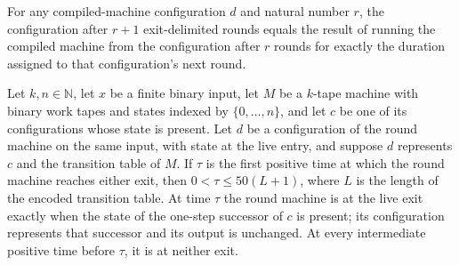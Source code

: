\begin{lemma}
\label{Turing.StepBlock.loopOrbit_succ}
\leanok
{}
For any compiled-machine configuration $d$ and natural number $r$, the configuration
after $r+1$ exit-delimited rounds equals the result of running the compiled machine from
the configuration after $r$ rounds for exactly the duration assigned to that
configuration's next round.
\end{lemma}

\begin{lemma}
\label{Turing.StepBlock.loopRoundTime_spec}
\leanok
{}
Let $k,n\in\mathbb N$, let $x$ be a finite binary input, let $M$ be a $k$-tape machine
with binary work tapes and states indexed by $\{0,\ldots,n\}$, and let $c$ be one of its
configurations whose state is present. Let $d$ be a configuration of the round machine
on the same input, with state at the live entry, and suppose $d$ represents $c$ and the
transition table of $M$. If $\tau$ is the first positive time at which the round machine
reaches either exit, then $0<\tau\le 50(L+1)$, where $L$ is the length of the encoded
transition table. At time $\tau$ the round machine is at the live exit exactly when the
state of the one-step successor of $c$ is present; its configuration represents that
successor and its output is unchanged. At every intermediate positive time before
$\tau$, it is at neither exit.
\end{lemma}

